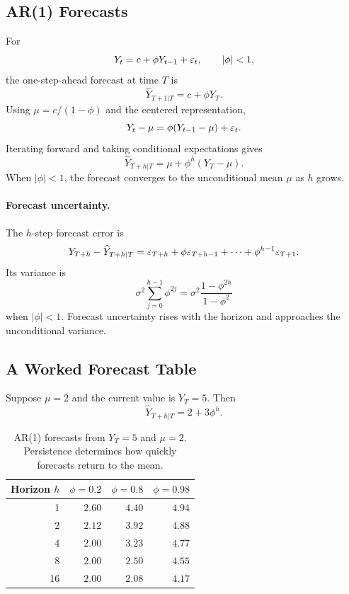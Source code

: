 \subsection{AR(1) Forecasts}
For
\[
Y_t=c+\phi Y_{t-1}+\varepsilon_t,
\qquad |\phi|<1,
\]
the one-step-ahead forecast at time $T$ is
\begin{equation}
\widehat{Y}_{T+1|T}=c+\phi Y_T.
\label{eq:ar1_forecast1}
\end{equation}
Using $\mu=c/(1-\phi)$ and the centered representation,
\[
Y_{t}-\mu=\phi(Y_{t-1}-\mu)+\varepsilon_t.
\]
Iterating forward and taking conditional expectations gives
\begin{equation}
\widehat{Y}_{T+h|T}
=\mu+\phi^h(Y_T-\mu).
\label{eq:ar1_forecasth}
\end{equation}
When $|\phi|<1$, the forecast converges to the unconditional mean $\mu$ as $h$ grows.

\paragraph{Forecast uncertainty.}
The $h$-step forecast error is
\[
Y_{T+h}-\widehat{Y}_{T+h|T}
=\varepsilon_{T+h}+\phi\varepsilon_{T+h-1}+\cdots+\phi^{h-1}\varepsilon_{T+1}.
\]
Its variance is
\[
\sigma^2\sum_{j=0}^{h-1}\phi^{2j}
=\sigma^2\frac{1-\phi^{2h}}{1-\phi^2}
\]
when $|\phi|<1$. Forecast uncertainty rises with the horizon and approaches the unconditional variance.

\subsection{A Worked Forecast Table}
Suppose $\mu=2$ and the current value is $Y_T=5$. Then
\[
\widehat{Y}_{T+h|T}=2+3\phi^h.
\]
\begin{table}[h]
\centering
\small
\begin{tabular}{rrrr}
\toprule
Horizon $h$ & $\phi=0.2$ & $\phi=0.8$ & $\phi=0.98$ \\
\midrule
1 & $2.60$ & $4.40$ & $4.94$ \\
2 & $2.12$ & $3.92$ & $4.88$ \\
4 & $2.00$ & $3.23$ & $4.77$ \\
8 & $2.00$ & $2.50$ & $4.55$ \\
16 & $2.00$ & $2.08$ & $4.17$ \\
\bottomrule
\end{tabular}
\caption{AR(1) forecasts from $Y_T=5$ and $\mu=2$. Persistence determines how quickly forecasts return to the mean.}
\label{tab:forecast_phi}
\end{table}

